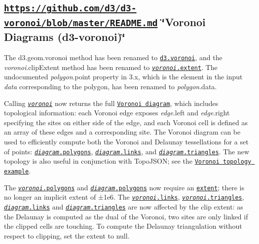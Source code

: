 \subsection*{\href{https://github.com/d3/d3-voronoi/blob/master/README.md}{\tt https\+://github.\+com/d3/d3-\/voronoi/blob/master/\+R\+E\+A\+D\+M\+E.\+md} \char`\"{}\+Voronoi Diagrams (d3-\/voronoi)\char`\"{}}

The d3.\+geom.\+voronoi method has been renamed to \href{https://github.com/d3/d3-voronoi/blob/master/README.md#voronoi}{\tt d3.\+voronoi}, and the {\itshape voronoi}.clip\+Extent method has been renamed to \href{https://github.com/d3/d3-voronoi/blob/master/README.md#voronoi_extent}{\tt {\itshape voronoi}.extent}. The undocumented {\itshape polygon}.point property in 3.\+x, which is the element in the input {\itshape data} corresponding to the polygon, has been renamed to {\itshape polygon}.data.

Calling \href{https://github.com/d3/d3-voronoi/blob/master/README.md#_voronoi}{\tt {\itshape voronoi}} now returns the full \href{https://github.com/d3/d3-voronoi/blob/master/README.md#voronoi-diagrams}{\tt Voronoi diagram}, which includes topological information\+: each Voronoi edge exposes {\itshape edge}.left and {\itshape edge}.right specifying the sites on either side of the edge, and each Voronoi cell is defined as an array of these edges and a corresponding site. The Voronoi diagram can be used to efficiently compute both the Voronoi and Delaunay tessellations for a set of points\+: \href{https://github.com/d3/d3-voronoi/blob/master/README.md#diagram_polygons}{\tt {\itshape diagram}.polygons}, \href{https://github.com/d3/d3-voronoi/blob/master/README.md#diagram_links}{\tt {\itshape diagram}.links}, and \href{https://github.com/d3/d3-voronoi/blob/master/README.md#diagram_triangles}{\tt {\itshape diagram}.triangles}. The new topology is also useful in conjunction with Topo\+J\+S\+ON; see the \href{https://bl.ocks.org/mbostock/cd52a201d7694eb9d890}{\tt Voronoi topology example}.

The \href{https://github.com/d3/d3-voronoi/blob/master/README.md#voronoi_polygons}{\tt {\itshape voronoi}.polygons} and \href{https://github.com/d3/d3-voronoi/blob/master/README.md#diagram_polygons}{\tt {\itshape diagram}.polygons} now require an \href{https://github.com/d3/d3-voronoi/blob/master/README.md#voronoi_extent}{\tt extent}; there is no longer an implicit extent of ±1e6. The \href{https://github.com/d3/d3-voronoi/blob/master/README.md#voronoi_links}{\tt {\itshape voronoi}.links}, \href{https://github.com/d3/d3-voronoi/blob/master/README.md#voronoi_triangles}{\tt {\itshape voronoi}.triangles}, \href{https://github.com/d3/d3-voronoi/blob/master/README.md#diagram_links}{\tt {\itshape diagram}.links} and \href{https://github.com/d3/d3-voronoi/blob/master/README.md#diagram_triangles}{\tt {\itshape diagram}.triangles} are now affected by the clip extent\+: as the Delaunay is computed as the dual of the Voronoi, two sites are only linked if the clipped cells are touching. To compute the Delaunay triangulation without respect to clipping, set the extent to null.

